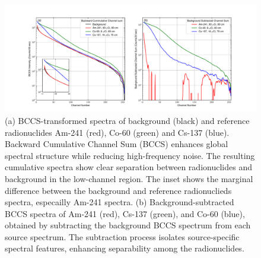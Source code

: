 \documentclass[10pt]{wlscirep}
\begin{document}
\begin{figure}[ht]
\centering
\includegraphics[width=\linewidth]{newfigures/figure2.pdf}

\caption{(a) BCCS-transformed spectra of background (black) and reference radionuclides Am-241 (red), Co-60 (green) and Cs-137 (blue). Backward Cumulative Channel Sum (BCCS) enhances global spectral structure while reducing high-frequency noise. The resulting cumulative spectra show clear separation between radionuclides and background in the low-channel region. The inset shows the marginal difference between the background and reference radionuclieds spectra, especailly Am-241 spectra. (b) Background-subtracted BCCS spectra of Am-241 (red), Cs-137 (green), and Co-60 (blue), obtained by subtracting the background BCCS spectrum from each source spectrum. The subtraction process isolates source-specific spectral features, enhancing separability among the radionuclides.}
\label{fig:channelsum}
\end{figure}

\newpage 
\end{document}
